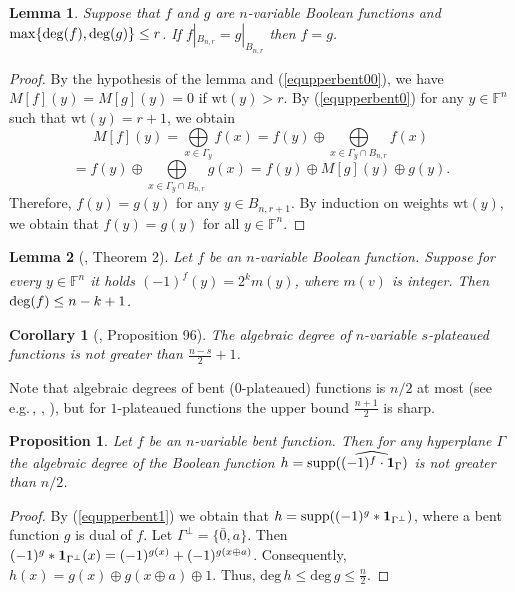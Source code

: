 \documentclass[a4paper,12pt]{article}   %
\newtheorem{lemma}{Lemma}
\newtheorem{proposition}{Proposition}
\newtheorem{corollary}{Corollary}
\begin{document}
\begin{lemma}\label{ball}
Suppose that $f$ and $g$ are $n$-variable Boolean functions  and\\
$\max\{{\rm deg}(f),{\rm deg}(g)\}\leq r$. If
$f|_{B_{n,r}}=g|_{B_{n,r}}$ then $f=g$.
\end{lemma}
\begin{proof}
 By the hypothesis  of the
lemma and (\ref{equpperbent00}), we have
    $M[f](y)=M[g](y)=0$ if $\mathrm{wt}(y)>r$. By (\ref{equpperbent0})
     for any $y\in \mathbb{F}^n$ such that $\mathrm{wt}(y)=r+1$,  we obtain
$$M[f](y)=\bigoplus\limits_{x\in \Gamma_y}f(x)=
f(y)\oplus\bigoplus\limits_{x\in \Gamma_y\cap B_{n,r}}f(x) $$
$$=f(y)\oplus\bigoplus\limits_{x\in \Gamma_y\cap
B_{n,r}}g(x)= f(y)\oplus M[g](y)\oplus g(y).$$ Therefore, $f(y)=
g(y)$ for any $y\in B_{n,r+1}$. By induction on weights
$\mathrm{wt}(y)$, we obtain that $f(y)= g(y)$ for all $y\in
\mathbb{F}^n$.
\end{proof}



\begin{lemma}[\cite{Carlet}, Theorem 2]\label{lemdeg} Let $f$ be an $n$-variable Boolean function. Suppose for every
$y\in \mathbb{F}^n$ it holds $\widehat{(-1)^f}(y)=2^km(y)$, where
$m(v)$ is integer. Then ${\rm deg}(f) \leq n-k+1$. \end{lemma}



\begin{corollary}[\cite{Carlet}, Proposition 96]\label{cordeg}
The algebraic degree of $n$-variable $s$-plateaued functions is not
greater than $\frac{n-s}{2}+1$.
\end{corollary}

Note that algebraic degrees of bent ($0$-plateaued) functions is
$n/2$ at most (see e.g.\,\cite{Carlet}, \cite{CarMes}, \cite{Mes0}),
but for $1$-plateaued functions the upper bound $\frac{n+1}{2}$ is
sharp.


\begin{proposition}\label{bentpla19}
Let $f$ be an $n$-variable bent function. Then for any hyperplane
$\Gamma$ the algebraic degree of the Boolean function $h=\mathrm{
supp} (\widehat{(-1)^{f}\cdot{\bf1}_{\Gamma}})$ is not greater than
$n/2$.
\end{proposition}
\begin{proof}
 By  (\ref{equpperbent1}) we obtain that $h=\mathrm{
 supp}((-1)^g*{\bf1}_{\Gamma^\perp})$, where a bent
 function  $g$ is dual of $f$. Let $\Gamma^\perp=\{\bar{ 0}, a\}$. Then
 $(-1)^g*{\bf1}_{\Gamma^\perp}(x)=(-1)^{g(x)}+(-1)^{g(x\oplus a)}$.
 Consequently, $h(x)=g(x)\oplus g(x\oplus a)\oplus 1$. Thus,
 $\mathrm{deg}\,h\leq\mathrm{deg}\,g\leq\frac{n}{2}$.
 \end{proof}
\end{document}
